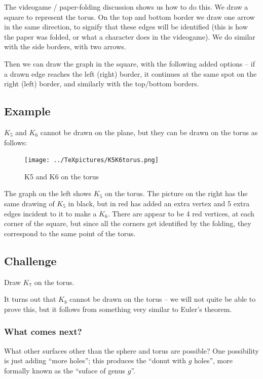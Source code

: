 \documentclass[]{article}
\begin{document}
The videogame / paper-folding discussion shows us how to do this. We
draw a square to represent the torus. On the top and bottom border we
draw one arrow in the same direction, to signify that these edges will
be identified (this is how the paper was folded, or what a character
does in the videogame). We do similar with the side borders, with two
arrows.

Then we can draw the graph in the square, with the following added
options -- if a drawn edge reaches the left (right) border, it continues
at the same spot on the right (left) border, and similarly with the
top/bottom borders.

\subsection{Example}\label{example-9}

\(K_5\) and \(K_6\) cannot be drawn on the plane, but they can be drawn
on the torus as follows:

\begin{figure}[htbp]
\centering
\texttt{[image: ../TeXpictures/K5K6torus.png]}
\caption{K5 and K6 on the torus}
\end{figure}

The graph on the left shows \(K_5\) on the torus. The picture on the
right has the same drawing of \(K_5\) in black, but in red has added an
extra vertex and 5 extra edges incident to it to make a \(K_6\). There
are appear to be 4 red vertices, at each corner of the square, but since
all the corners get identified by the folding, they correspond to the
same point of the torus.

\subsection{Challenge}\label{challenge}

Draw \(K_7\) on the torus.

It turns out that \(K_8\) cannot be drawn on the torus -- we will not quite be able to prove this, but it follows from something very similar to Euler's theorem.



\subsubsection{What comes next?}\label{what-comes-next}

What other surfaces other than the sphere and torus are possible? One
possibility is just adding ``more holes''; this produces the ``donut
with \(g\) holes'', more formally known as the ``suface of genus
\(g\)''.
\end{document}
